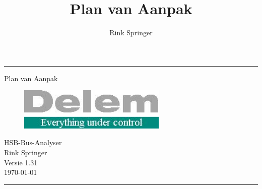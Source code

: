 \documentclass[a4paper,11pt]{book}
\author{Rink Springer}
\title{Plan van Aanpak}
\begin{document}
\frontmatter

\begin{titlepage}
\hrule
\vspace*{\fill}
\begin{center}
{\Huge Plan van Aanpak} \\
\vspace{2cm}
\begin{figure}[htb]
\begin{center}
\includegraphics[height=2cm]{delem_logo.jpg}
\end{center}
\end{figure}
HSB-Bus-Analyser\\
\vspace{2cm}
{\large Rink Springer}\\
\vspace{2cm}
Versie 1.31\\
\today\\
\vspace{2cm}
\end{center}
\vspace*{\fill}
\hrule
\end{titlepage}



\tableofcontents





\mainmatter















\appendix


\backmatter
\printindex
\end{document}
